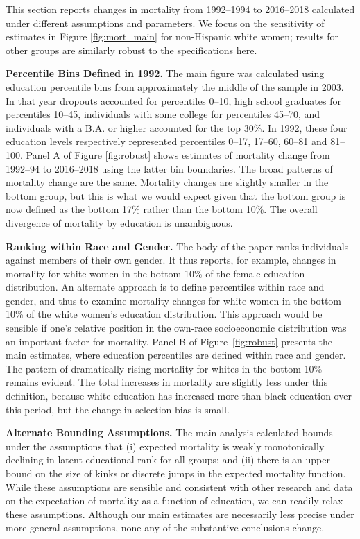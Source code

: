 \normalsize This section reports changes in mortality from 1992--1994 to 2016--2018 calculated under different assumptions and parameters. We focus on the sensitivity of estimates in Figure \ref{fig:mort_main} for non-Hispanic white women; results for other groups are similarly robust to the specifications here.

\textbf{Percentile Bins Defined in 1992.}  The main figure was calculated using education percentile bins from approximately the middle of the sample in 2003. In that year dropouts accounted for percentiles 0--10, high school graduates for percentiles 10--45, individuals with some college for percentiles 45--70, and individuals with a B.A. or higher accounted for the top 30\%. In 1992, these four education levels respectively represented percentiles 0--17, 17--60, 60--81 and 81--100. Panel A of Figure \ref{fig:robust} shows estimates of mortality change from 1992--94 to 2016--2018 using the latter bin boundaries. The broad patterns of mortality change are the same. Mortality changes are slightly smaller in the bottom group, but this is what we would expect given that the bottom group is now defined as the bottom 17\% rather than the bottom 10\%. The overall divergence of mortality by education is unambiguous.

\vspace{6mm} \textbf{Ranking within Race and Gender.} The body of the paper ranks individuals against members of their own gender. It thus reports, for example, changes in mortality for white women in the bottom 10\% of the female education distribution. An alternate approach is to define percentiles within race and gender, and thus to examine mortality changes for white women in the bottom 10\% of the white women's education distribution. This approach would be sensible if one's relative position in the own-race socioeconomic distribution was an important factor for mortality. Panel B of Figure~\ref{fig:robust} presents the main estimates, where education percentiles are defined within race and gender. The pattern of dramatically rising mortality for whites in the bottom 10\% remains evident. The total increases in mortality are slightly less under this definition, because white education has increased more than black education over this period, but the change in selection bias is small.

\vspace{6mm} \textbf{Alternate Bounding Assumptions.} The main analysis calculated bounds under the assumptions that (i) expected mortality is weakly monotonically declining in latent educational rank for all groups; and (ii) there is an upper bound on the size of kinks or discrete jumps in the expected mortality function.
While these assumptions are sensible and consistent with other
research and data on the expectation of mortality as a function of
education, we can readily relax these assumptions. Although our main
estimates are necessarily less precise under more general assumptions,
none any of the substantive conclusions change. 

